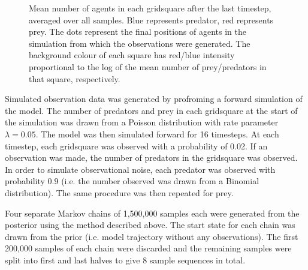 \documentclass{article}
\begin{document}
\begin{figure}
	\centering
	\caption{Mean number of agents in each gridsquare after the last timestep, averaged over all samples. Blue represents predator, red represents prey. The dots represent the final positions of agents in the simulation from which the observations were generated. The background colour of each square has red/blue intensity proportional to the log of the mean number of prey/predators in that square, respectively.}
	\label{figEndState}
\end{figure}


Simulated observation data was generated by profroming a forward simulation of the model. The number of predators and prey in each gridsquare at the start of the simulation was drawn from a Poisson distribution with rate parameter $\lambda = 0.05$. The model was then simulated forward for 16 timesteps. At each timestep, each gridsquare was observed with a probability of 0.02. If an observation was made, the number of predators in the gridsquare was observed. In order to simulate observational noise, each predator was observed with probability 0.9 (i.e. the number observed was drawn from a Binomial distribution). The same procedure was then repeated for prey.

Four separate Markov chains of 1,500,000 samples each were generated from the posterior using the method described above. The start state for each chain was drawn from the prior (i.e. model trajectory without any observations). The first 200,000 samples of each chain were discarded and the remaining samples were split into first and last halves to give 8 sample sequences in total. 
\end{document}
